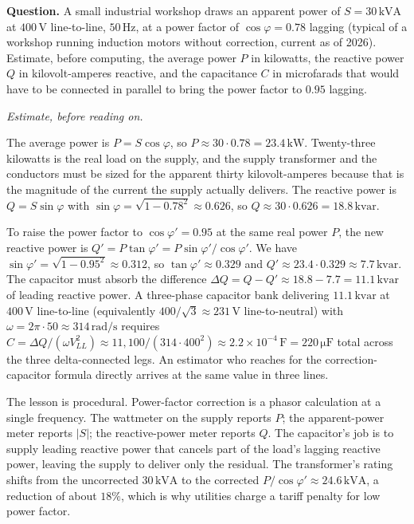 \begin{estimation}
\textbf{Question.} A small industrial workshop draws an apparent
power of $S = 30 \,\si{\kilo\text{VA}}$ at $400\,\si{\volt}$
line-to-line, $50\,\si{\hertz}$, at a power factor of
$\cos\varphi = 0.78$ lagging (typical of a workshop running
induction motors without correction, current as of 2026). Estimate,
before computing, the average power $P$ in kilowatts, the
reactive power $Q$ in kilovolt-amperes reactive, and the
capacitance $C$ in microfarads that would have to be connected in
parallel to bring the power factor to $0.95$ lagging.

\smallskip
\textit{Estimate, before reading on.}

\smallskip
The average power is $P = S\cos\varphi$, so $P \approx 30 \cdot
0.78 = 23.4 \,\si{\kilo\watt}$. Twenty-three kilowatts is the
real load on the supply, and the supply transformer and the
conductors must be sized for the apparent thirty kilovolt-amperes
because that is the magnitude of the current the supply actually
delivers. The reactive power is $Q = S\sin\varphi$ with
$\sin\varphi = \sqrt{1 - 0.78^{2}} \approx 0.626$, so $Q \approx
30 \cdot 0.626 = 18.8 \,\si{\kilo\text{var}}$.

To raise the power factor to $\cos\varphi' = 0.95$ at the same
real power $P$, the new reactive power is $Q' = P\tan\varphi'
= P \sin\varphi'/\cos\varphi'$. We have $\sin\varphi' = \sqrt{1 -
0.95^{2}} \approx 0.312$, so $\tan\varphi' \approx 0.329$ and
$Q' \approx 23.4 \cdot 0.329 \approx 7.7 \,\si{\kilo\text{var}}$.
The capacitor must absorb the difference $\Delta Q = Q - Q'
\approx 18.8 - 7.7 = 11.1 \,\si{\kilo\text{var}}$ of leading
reactive power. A three-phase capacitor bank delivering
$11.1 \,\si{\kilo\text{var}}$ at $400\,\si{\volt}$ line-to-line
(equivalently $400/\sqrt{3} \approx 231\,\si{\volt}$
line-to-neutral) with $\omega = 2\pi \cdot 50 \approx 314 \,\si
{\radian\per\second}$ requires $C = \Delta Q / (\omega V_{LL}^{2})
\approx 11{,}100 / (314 \cdot 400^{2}) \approx 2.2 \times 10^{-4}
\,\si{\farad} = 220 \,\si{\micro\farad}$ total across the three
delta-connected legs. An estimator who reaches for the
correction-capacitor formula directly arrives at the same value
in three lines.

The lesson is procedural. Power-factor correction is a phasor
calculation at a single frequency. The wattmeter on the supply
reports $P$; the apparent-power meter reports $|S|$; the
reactive-power meter reports $Q$. The capacitor's job is to
supply leading reactive power that cancels part of the load's
lagging reactive power, leaving the supply to deliver only the
residual. The transformer's rating shifts from the
uncorrected $30 \,\si{\kilo\text{VA}}$ to the corrected
$P/\cos\varphi' \approx 24.6 \,\si{\kilo\text{VA}}$, a reduction
of about $18\%$, which is why utilities charge a tariff penalty
for low power factor.
\end{estimation}

